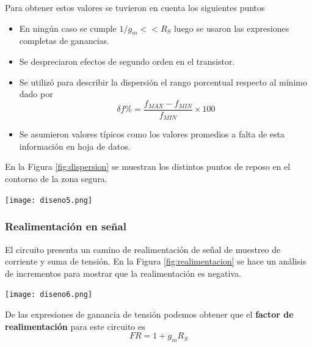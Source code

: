         \begin{multicols}{2}
        Para obtener estos valores se tuvieron en cuenta los siguientes puntos

        \begin{itemize}
        	\item En ningún caso se cumple $1/g_m << R_S$ luego se usaron las expresiones completas de ganancias.
        	\item Se despreciaron efectos de segundo orden en el transistor.
        	\item Se utilizó para describir la dispersión el rango porcentual respecto al mínimo dado por
        		\begin{equation}
        		\delta f \% = \frac{f_{MAX}-f_{MIN}}{f_{MIN}}\times 100 \nonumber
        		\end{equation}
        	\item Se asumieron valores típicos como los valores promedios a falta de esta información en hoja de datos.

        	\end{itemize}


        En la Figura \ref{fig:dispersion} se muestran los distintos puntos de reposo en el contorno de la zona segura.

        \begin{center}
                   \texttt{[image: diseno5.png]}
                   \label{fig:dispersion}
        \end{center}


        \subsubsection{Realimentación en señal}

        El circuito presenta un camino de realimentación de señal de muestreo de corriente y suma de tensión. En la Figura \ref{fig:realimentacion} se hace un análisis de incrementos para mostrar que la realimentación es negativa.


        \begin{center}
                   \texttt{[image: diseno6.png]}
                   \label{fig:realimentacion}
        \end{center}


        De las expresiones de ganancia de tensión podemos obtener que el \textbf{factor de realimentación} para este circuito es
        \begin{equation}
        	FR = 1+g_mR_S
        	\end{equation}


\end{multicols}
